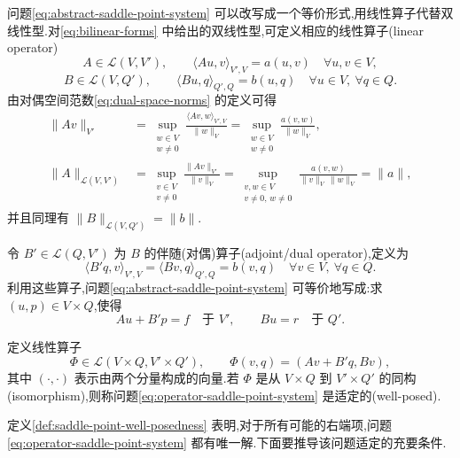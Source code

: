 \begin{note}[线性鞍点问题的算子形式]\label{note:operator-form-saddle-point}
问题\cref{eq:abstract-saddle-point-system} 可以改写成一个等价形式,用线性算子代替双线性型.对\cref{eq:bilinear-forms} 中给出的双线性型,可定义相应的线性算子(linear operator)
\[
  A\in\mathcal{L}(V,V'),\qquad
  \langle Au,v\rangle_{V',V}=a(u,v)\quad\forall u,v\in V,
\]
\[
  B\in\mathcal{L}(V,Q'),\qquad
  \langle Bu,q\rangle_{Q',Q}=b(u,q)\quad\forall u\in V,\ \forall q\in Q.
\]
由对偶空间范数\cref{eq:dual-space-norms} 的定义可得
\[
\begin{aligned}
  \|Av\|_{V'}
    &=\sup_{\substack{w\in V\\w\ne0}}
      \frac{\langle Av,w\rangle_{V',V}}{\|w\|_V}
      =\sup_{\substack{w\in V\\w\ne0}}
      \frac{a(v,w)}{\|w\|_V},\\
  \|A\|_{\mathcal{L}(V,V')}
    &=\sup_{\substack{v\in V\\v\ne0}}
      \frac{\|Av\|_{V'}}{\|v\|_V}
      =\sup_{\substack{v,w\in V\\v\ne0,\,w\ne0}}
      \frac{a(v,w)}{\|v\|_V\,\|w\|_V}=\|a\|,
\end{aligned}
\]
并且同理有 $\|B\|_{\mathcal{L}(V,Q')}=\|b\|$.

令 $B'\in\mathcal{L}(Q,V')$ 为 $B$ 的伴随(对偶)算子(adjoint/dual operator),定义为
\[
  \langle B'q,v\rangle_{V',V}
  =\langle Bv,q\rangle_{Q',Q}
  =b(v,q)\quad\forall v\in V,\ \forall q\in Q.
\]
利用这些算子,问题\cref{eq:abstract-saddle-point-system} 可等价地写成:求 $(u,p)\in V\times Q$,使得
\begin{equation}\label{eq:operator-saddle-point-system}
  Au+B'p=f\quad\text{于 }V',\qquad
  Bu=r\quad\text{于 }Q'.
\end{equation}
\end{note}

\begin{definition}\label{def:saddle-point-well-posedness}
定义线性算子
\[
  \Phi\in\mathcal{L}(V\times Q,V'\times Q'),\qquad
  \Phi(v,q)=(Av+B'q,Bv),
\]
其中 $(\cdot,\cdot)$ 表示由两个分量构成的向量.若 $\Phi$ 是从 $V\times Q$ 到 $V'\times Q'$ 的同构(isomorphism),则称问题\cref{eq:operator-saddle-point-system} 是适定的(well-posed).
\end{definition}

\begin{note}\label{note:on-well-posedness}
定义\ref{def:saddle-point-well-posedness} 表明,对于所有可能的右端项,问题\cref{eq:operator-saddle-point-system} 都有唯一解.下面要推导该问题适定的充要条件.
\end{note}

